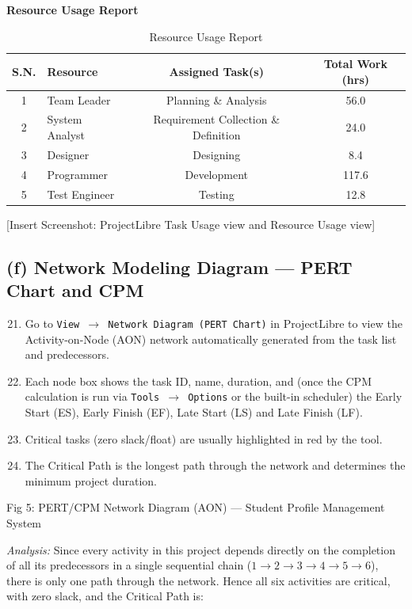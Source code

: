 \documentclass[10pt,a4paper]{article}
\begin{document}
\vspace{0.2cm}
\noindent\textbf{Resource Usage Report}

\begin{table}[h!]
\centering
\renewcommand{\arraystretch}{1.15}
\begin{tabular}{|c|l|c|c|}
\hline
\textbf{S.N.} & \textbf{Resource} & \textbf{Assigned Task(s)} & \textbf{Total Work (hrs)} \\ \hline
1 & Team Leader & Planning \& Analysis & 56.0 \\ \hline
2 & System Analyst & Requirement Collection \& Definition & 24.0 \\ \hline
3 & Designer & Designing & 8.4 \\ \hline
4 & Programmer & Development & 117.6 \\ \hline
5 & Test Engineer & Testing & 12.8 \\ \hline
\end{tabular}
\caption*{Resource Usage Report}
\end{table}

[Insert Screenshot: ProjectLibre Task Usage view and Resource Usage view]

\subsection*{(f) Network Modeling Diagram --- PERT Chart and CPM}

\begin{enumerate}[nosep]
    \setcounter{enumi}{20}
    \item Go to \texttt{View $\to$ Network Diagram (PERT Chart)} in ProjectLibre to view the Activity-on-Node (AON) network automatically generated from the task list and predecessors.
    \item Each node box shows the task ID, name, duration, and (once the CPM calculation is run via \texttt{Tools $\to$ Options} or the built-in scheduler) the Early Start (ES), Early Finish (EF), Late Start (LS) and Late Finish (LF).
    \item Critical tasks (zero slack/float) are usually highlighted in red by the tool.
    \item The Critical Path is the longest path through the network and determines the minimum project duration.
\end{enumerate}

Fig 5: PERT/CPM Network Diagram (AON) --- Student Profile Management System

\vspace{0.2cm}
\noindent\textit{Analysis:} Since every activity in this project depends directly on the completion of all its predecessors in a single sequential chain ($1\to2\to3\to4\to5\to6$), there is only one path through the network. Hence all six activities are critical, with zero slack, and the Critical Path is:
\end{document}
